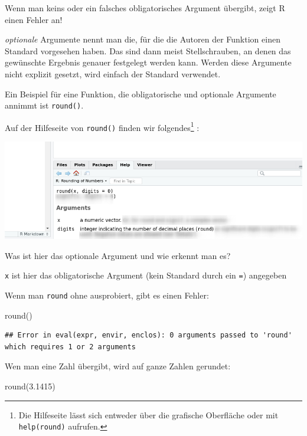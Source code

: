 \documentclass[
]{book}
\newenvironment{Shaded}{\begin{snugshade}}{\end{snugshade}}
\newcommand{\FloatTok}[1]{\textcolor[rgb]{0.00,0.00,0.81}{#1}}
\newcommand{\FunctionTok}[1]{\textcolor[rgb]{0.00,0.00,0.00}{#1}}
\newcommand{\NormalTok}[1]{#1}
\begin{document}
Wenn man keins oder ein falsches obligatorisches Argument übergibt, zeigt R einen Fehler an!

\emph{optionale} Argumente nennt man die, für die die Autoren der Funktion einen Standard vorgesehen haben. Das sind dann meist Stellschrauben, an denen das gewünschte Ergebnis genauer festgelegt werden kann. Werden diese Argumente nicht explizit gesetzt, wird einfach der Standard verwendet.

Ein Beispiel für eine Funktion, die obligatorische und optionale Argumente annimmt ist \texttt{round()}.

Auf der Hilfeseite von \texttt{round()} finden wir folgendes\footnote{Die Hilfeseite lässt sich entweder über die grafische Oberfläche oder mit \texttt{help(\textquotesingle{}round\textquotesingle{})} aufrufen.} :

\begin{center}\includegraphics[width=0.8\linewidth]{imgs/help} \end{center}

Was ist hier das optionale Argument und wie erkennt man es?

\texttt{x} ist hier das obligatorische Argument (kein Standard durch ein \texttt{=}) angegeben

Wenn man \texttt{round} ohne ausprobiert, gibt es einen Fehler:

\begin{Shaded}
\begin{Highlighting}[]
\FunctionTok{round}\NormalTok{()}
\end{Highlighting}
\end{Shaded}

\begin{verbatim}
## Error in eval(expr, envir, enclos): 0 arguments passed to 'round' which requires 1 or 2 arguments
\end{verbatim}

Wen man eine Zahl übergibt, wird auf ganze Zahlen gerundet:

\begin{Shaded}
\begin{Highlighting}[]
\FunctionTok{round}\NormalTok{(}\FloatTok{3.1415}\NormalTok{)}
\end{Highlighting}
\end{Shaded}
\end{document}
